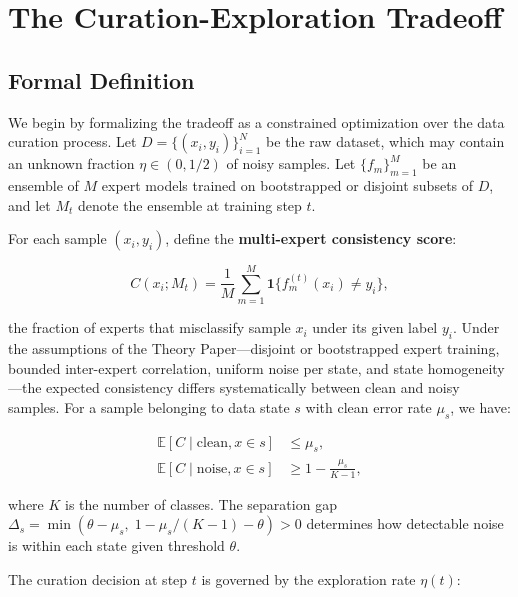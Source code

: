 \documentclass{article}
\begin{document}
\section{The Curation-Exploration Tradeoff}
\label{sec:tradeoff}

\subsection{Formal Definition}
\label{sec:formal}

We begin by formalizing the tradeoff as a constrained optimization over the data curation process. Let $D = \{(x_i, y_i)\}_{i=1}^N$ be the raw dataset, which may contain an unknown fraction $\eta \in (0, 1/2)$ of noisy samples. Let $\{f_m\}_{m=1}^M$ be an ensemble of $M$ expert models trained on bootstrapped or disjoint subsets of $D$, and let $M_t$ denote the ensemble at training step $t$.

For each sample $(x_i, y_i)$, define the \textbf{multi-expert consistency score}:

\begin{equation}
C(x_i; M_t) = \frac{1}{M} \sum_{m=1}^M \mathbf{1}\bigl\{f_m^{(t)}(x_i) \neq y_i\bigr\},
\label{eq:consistency}
\end{equation}

the fraction of experts that misclassify sample $x_i$ under its given label $y_i$. Under the assumptions of the Theory Paper---disjoint or bootstrapped expert training, bounded inter-expert correlation, uniform noise per state, and state homogeneity---the expected consistency differs systematically between clean and noisy samples. For a sample belonging to data state $s$ with clean error rate $\mu_s$, we have:

\begin{align}
\mathbb{E}[C \mid \text{clean}, x \in s] &\leq \mu_s, \label{eq:clean_expected} \\
\mathbb{E}[C \mid \text{noise}, x \in s] &\geq 1 - \frac{\mu_s}{K-1}, \label{eq:noise_expected}
\end{align}

where $K$ is the number of classes. The separation gap $\Delta_s = \min(\theta - \mu_s,\; 1 - \mu_s/(K-1) - \theta) > 0$ determines how detectable noise is within each state given threshold $\theta$.

The curation decision at step $t$ is governed by the exploration rate $\eta(t)$:
\end{document}
